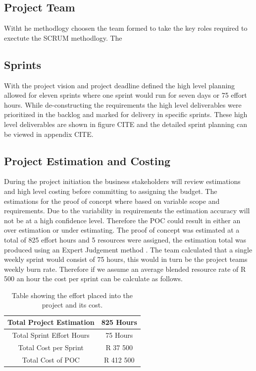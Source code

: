 \documentclass[12pt]{witseiepaper}
\begin{document}
\subsection{Project Team}

Witht he methodlogy choosen the team formed to take the key roles required to exectute the SCRUM methodlogy. The 


\subsection{Sprints}
With the project vision and project deadline defined the high level planning allowed for eleven sprints \cite{ExpertJudgement} where one sprint would run for seven days or 75 effort hours. While de-constructing the requirements the high level deliverables were prioritized in the backlog and marked for delivery in specific sprints. These high level deliverables are shown in figure CITE and the detailed sprint planning can be viewed in appendix CITE.




\subsection{Project Estimation and Costing}
During the project initiation the business stakeholders will review estimations and high level costing before committing to assigning the budget. The estimations for the proof of concept where based on variable scope and requirements. Due to the variability in requirements the estimation accuracy will not be at a high confidence level. Therefore the POC could result in either an over estimation or under estimating. The proof of concept was estimated at a total of 825 effort hours and 5 resources were assigned, the estimation total was produced using an Expert Judgement method \cite{ExpertJudgement}. The team calculated that a single weekly sprint would consist of 75 hours, this would in turn be the project teams weekly burn rate. Therefore if we assume an average blended resource rate of R 500 an hour the cost per sprint can be calculate as follows.



\begin{table}[htb] \caption{Table showing the effort placed into the project and its cost.} \label{tbl:cost} 
    \begin{center}
  \begin{tabular}
     {|c|c|} %
    \hline Total Project Estimation &825 Hours\\
    \hline Total Sprint Effort Hours &75 Hours\\
    \hline Total Cost per Sprint &R 37 500\\
    \hline Total Cost of POC & R 412 500 \\
    \hline 
  \end{tabular}
      \end{center}
\end{table}
\end{document}
